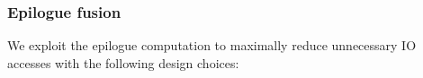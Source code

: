 

\subsubsection{Epilogue fusion}\label{sec:moe:epilogue}

We exploit the epilogue computation to maximally reduce unnecessary IO accesses with the following design choices:

